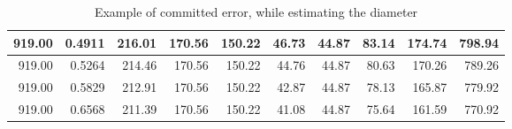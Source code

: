 \begin{table}[t!]
\begin{tabular}{|r|r|r|r|r|r|r|r|r|r|}
  919.00	&	0.4911	&	216.01	&	170.56	&	150.22	&	46.73	&	44.87	&	83.14	&	174.74	&	798.94	\\ \hline
  919.00	&	0.5264	&	214.46	&	170.56	&	150.22	&	44.76	&	44.87	&	80.63	&	170.26	&	789.26	\\ \hline
  919.00	&	0.5829	&	212.91	&	170.56	&	150.22	&	42.87	&	44.87	&	78.13	&	165.87	&	779.92	\\ \hline
  919.00	&	0.6568	&	211.39	&	170.56	&	150.22	&	41.08	&	44.87	&	75.64	&	161.59	&	770.92	\\ \hline
\end{tabular}

\caption{Example of committed error, while estimating the diameter}
\label{tab:diam:tab1}
\end{table}
